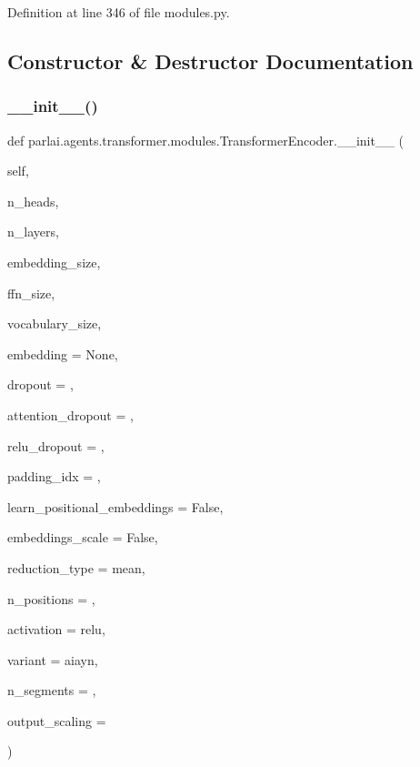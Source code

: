 Definition at line 346 of file modules.\+py.



\subsection{Constructor \& Destructor Documentation}
\mbox{\label{classparlai_1_1agents_1_1transformer_1_1modules_1_1TransformerEncoder_a362f8b951877f3712ca59f0fb6a0ae9c}} 
\subsubsection{\texorpdfstring{\+\_\+\+\_\+init\+\_\+\+\_\+()}{\_\_init\_\_()}}
{\footnotesize\ttfamily def parlai.\+agents.\+transformer.\+modules.\+Transformer\+Encoder.\+\_\+\+\_\+init\+\_\+\+\_\+ (\begin{DoxyParamCaption}\item[{}]{self,  }\item[{}]{n\+\_\+heads,  }\item[{}]{n\+\_\+layers,  }\item[{}]{embedding\+\_\+size,  }\item[{}]{ffn\+\_\+size,  }\item[{}]{vocabulary\+\_\+size,  }\item[{}]{embedding = {\ttfamily None},  }\item[{}]{dropout = {},  }\item[{}]{attention\+\_\+dropout = {},  }\item[{}]{relu\+\_\+dropout = {},  }\item[{}]{padding\+\_\+idx = {},  }\item[{}]{learn\+\_\+positional\+\_\+embeddings = {\ttfamily False},  }\item[{}]{embeddings\+\_\+scale = {\ttfamily False},  }\item[{}]{reduction\+\_\+type = {\ttfamily \textquotesingle{}mean\textquotesingle{}},  }\item[{}]{n\+\_\+positions = {},  }\item[{}]{activation = {\ttfamily \textquotesingle{}relu\textquotesingle{}},  }\item[{}]{variant = {\ttfamily \textquotesingle{}aiayn\textquotesingle{}},  }\item[{}]{n\+\_\+segments = {},  }\item[{}]{output\+\_\+scaling = {} }\end{DoxyParamCaption})}



